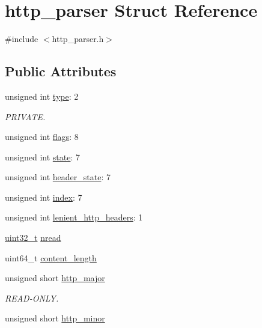 \hypertarget{structhttp__parser}{\section{http\-\_\-parser Struct Reference}
\label{structhttp__parser}
}


{\ttfamily \#include $<$http\-\_\-parser.\-h$>$}

\subsection*{Public Attributes}
\begin{DoxyCompactItemize}
\item 
unsigned int \hyperlink{structhttp__parser_ac6c327558547d55eb64a8aea1310cc2e}{type}\-: 2
\begin{DoxyCompactList}\small\item\em P\-R\-I\-V\-A\-T\-E. \end{DoxyCompactList}\item 
unsigned int \hyperlink{structhttp__parser_a5e54708e0cb3f9ced19bd829dcdeaf53}{flags}\-: 8
\item 
unsigned int \hyperlink{structhttp__parser_a6f5952e0b47c83aeacf64fc287fd8003}{state}\-: 7
\item 
unsigned int \hyperlink{structhttp__parser_ac5b254b99c6472ca19ae1f426758ce75}{header\-\_\-state}\-: 7
\item 
unsigned int \hyperlink{structhttp__parser_a6f7ba706f975f447b3bf72be97facdf8}{index}\-: 7
\item 
unsigned int \hyperlink{structhttp__parser_acd80a931fcc87d41999397af1662fc3c}{lenient\-\_\-http\-\_\-headers}\-: 1
\item 
\hyperlink{msus_2webserver_2uthash_8h_a435d1572bf3f880d55459d9805097f62}{uint32\-\_\-t} \hyperlink{structhttp__parser_a78085ca896bb3b9aa1ecb0f6fddc039d}{nread}
\item 
uint64\-\_\-t \hyperlink{structhttp__parser_a7fd5a194802b1206bb773e096d291f29}{content\-\_\-length}
\item 
unsigned short \hyperlink{structhttp__parser_ac994a4a8268652f5ce82de5bde5c3f9d}{http\-\_\-major}
\begin{DoxyCompactList}\small\item\em R\-E\-A\-D-\/\-O\-N\-L\-Y. \end{DoxyCompactList}\item 
unsigned short \hyperlink{structhttp__parser_ae8af6433c824f5348773842db62ad4ab}{http\-\_\-minor}

\end{DoxyCompactItemize}
